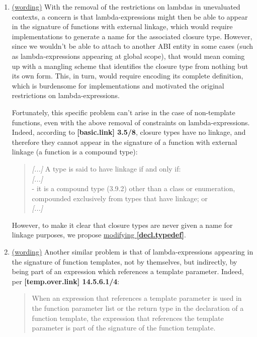 \documentclass{wg21}
\begin{document}
\begin{enumerate}
  \item \label{discussion.non-template}
    \hyperref[wording.non-template]{(wording)}
    With the removal of the restrictions on lambdas in unevaluated contexts,
    a concern is that lambda-expressions might then be able to appear in the
    signature of functions with external linkage, which would require implementations
    to generate a name for the associated closure type. However, since we wouldn't
    be able to attach to another ABI entity in some cases (such as lambda-expressions
    appearing at global scope), that would mean coming up with a mangling scheme
    that identifies the closure type from nothing but its own form. This, in turn,
    would require encoding its complete definition, which is burdensome for
    implementations and motivated the original restrictions on lambda-expressions.

    Fortunately, this specific problem can't arise in the case of non-template
    functions, even with the above removal of constraints on lambda-expressions.
    Indeed, according to \textbf{[basic.link] 3.5/8}, closure types have no linkage,
    and therefore they cannot appear in the signature of a function with external
    linkage (a function is a compound type):
    \begin{quote}
      \textit{[...]} A type is said to have linkage if and only if:\\
      \textit{[...]}\\
      - it is a compound type (3.9.2) other than a class or enumeration,
        compounded exclusively from types that have linkage; or \\
      \textit{[...]}
    \end{quote}

    However, to make it clear that closure types are never given a name for
    linkage purposes, we propose \hyperref[wording.non-template]{modifying
    \textbf{[decl.typedef]}}.


  \item \label{discussion.template}
    \hyperref[wording.template]{(wording)}
    Another similar problem is that of lambda-expressions appearing in the
    signature of function templates, not by themselves, but indirectly, by being
    part of an expression which references a template parameter. Indeed, per
    \textbf{[temp.over.link] 14.5.6.1/4}:
    \begin{quote}
      When an expression that references a template parameter is used in the
      function parameter list or the return type in the declaration of a function
      template, the expression that references the template parameter is part of
      the signature of the function template.
    \end{quote}


\end{enumerate}
\end{document}
